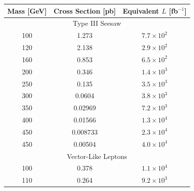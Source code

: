 
\begin{table}[htbp]
	\centering
	\scriptsize
	\begin{tabular}{|c||c|c|}
		\hline
		Mass [GeV] & Cross Section [pb] & Equivalent $L$ [fb$^{-1}$] \\
		\hline
		\multicolumn{3}{|c|}{Type III Seesaw} \\
		\hline
		100	&	1.273	 &	$7.7\times10^2$ \\%
		\hline
		120	&	2.138	 &	$2.9\times10^2$ \\%
		\hline
		160	&	0.853	 &	$6.5\times10^2$ \\%
		\hline
		200	&	0.346	 &	$1.4\times10^3$ \\%
		\hline
		250	&	0.135	 &	$3.5\times10^3$ \\%
		\hline
		300	&	0.0604	 &	$3.8\times10^3$ \\%
		\hline
		350	&	0.02969	 &	$7.2\times 10^3$ \\%
		\hline
		400	&	0.01566	 &	$1.3\times10^4$ \\%
		\hline
		450	&	0.008733 &	$2.3\times10^4$ \\%
		\hline
		450	&	0.00504	 &	$4.0\times10^4$ \\%
		\hline
		\multicolumn{3}{|c|}{Vector-Like Leptons} \\
		\hline
		100	& 0.378 	 	&	$1.1\times10^4$ \\%
		\hline
		110	& 0.264 	 	&	$9.2\times10^3$ \\%

\end{tabular}
\end{table}
